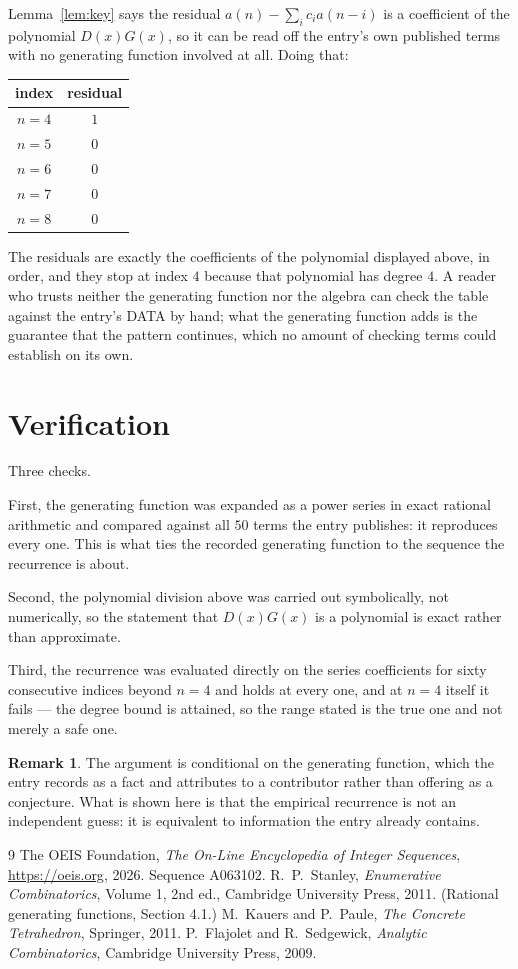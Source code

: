 \documentclass[11pt,a4paper]{article}
\theoremstyle{plain}
\theoremstyle{definition}
\newtheorem{remark}[theorem]{Remark}
\begin{document}
Lemma~\ref{lem:key} says the residual $a(n)-\sum_ic_ia(n-i)$ is a coefficient of the
polynomial $D(x)G(x)$, so it can be read off the entry's own published terms with no
generating function involved at all. Doing that:
\begin{center}
\begin{tabular}{cc}
index & residual \\ \hline
$n=4$ & $1$ \\
$n=5$ & $0$ \\
$n=6$ & $0$ \\
$n=7$ & $0$ \\
$n=8$ & $0$
\end{tabular}
\end{center}
The residuals are exactly the coefficients of the polynomial displayed above, in order, and
they stop at index $4$ because that polynomial has degree $4$. A reader who trusts
neither the generating function nor the algebra can check the table against the entry's DATA
by hand; what the generating function adds is the guarantee that the pattern continues, which
no amount of checking terms could establish on its own.

\section{Verification}

Three checks.

First, the generating function was expanded as a power series in exact rational arithmetic and
compared against all $50$ terms the entry publishes: it reproduces every one. This is
what ties the recorded generating function to the sequence the recurrence is about.

Second, the polynomial division above was carried out symbolically, not numerically, so the
statement that $D(x)G(x)$ is a polynomial is exact rather than approximate.

Third, the recurrence was evaluated directly on the series coefficients for sixty consecutive
indices beyond $n=4$ and holds at every one, and at $n=4$ itself it fails --- the
degree bound is attained, so the range stated is the true one and not merely a safe one.

\begin{remark}
The argument is conditional on the generating function, which the entry records as a fact and
attributes to a contributor rather than offering as a conjecture. What is shown here is that
the empirical recurrence is not an independent guess: it is equivalent to information the
entry already contains.
\end{remark}

\begin{thebibliography}{9}
 The OEIS Foundation, \emph{The On-Line Encyclopedia of Integer
Sequences}, \url{https://oeis.org}, 2026. Sequence A063102.
 R.~P.~Stanley, \emph{Enumerative Combinatorics}, Volume 1, 2nd ed.,
Cambridge University Press, 2011. (Rational generating functions, Section 4.1.)
 M.~Kauers and P.~Paule, \emph{The Concrete Tetrahedron}, Springer, 2011.
 P.~Flajolet and R.~Sedgewick, \emph{Analytic Combinatorics}, Cambridge
University Press, 2009.
\end{thebibliography}
\end{document}
